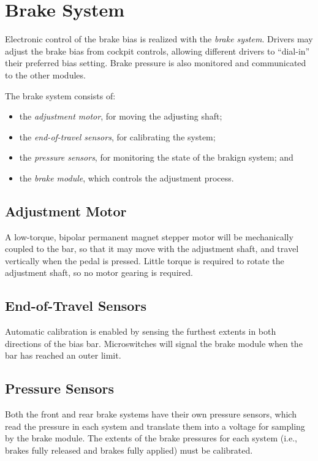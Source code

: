 %
%

\section{Brake System}
\label{brake_system}

Electronic control of the brake bias is realized with the \emph{brake system}. Drivers may adjust the brake bias from cockpit controls, allowing different drivers to {}``dial-in'' their preferred bias setting. Brake pressure is also monitored and communicated to the other modules.

The brake system consists of: 

\begin{itemize}
\item the \emph{adjustment motor}, for moving the adjusting shaft;
\item the \emph{end-of-travel sensors}, for calibrating the system; 
\item the \emph{pressure sensors}, for monitoring the state of the brakign system; and
\item the \emph{brake module}, which controls the adjustment process.
\end{itemize}

\subsection{Adjustment Motor}

A low-torque, bipolar permanent magnet stepper motor will be mechanically coupled to the bar, so that it may move with the adjustment shaft, and travel vertically when the pedal is pressed. Little torque is required to rotate the adjustment shaft, so no motor gearing is required. 

\subsection{End-of-Travel Sensors}

Automatic calibration is enabled by sensing the furthest extents in both directions of the bias bar. Microswitches will signal the brake module when the bar has reached an outer limit. 

\subsection{Pressure Sensors}

Both the front and rear brake systems have their own pressure sensors, which read the pressure in each system and translate them into a voltage for sampling by the brake module. The extents of the brake pressures for each system (i.e., brakes fully released and brakes fully applied) must be calibrated.

